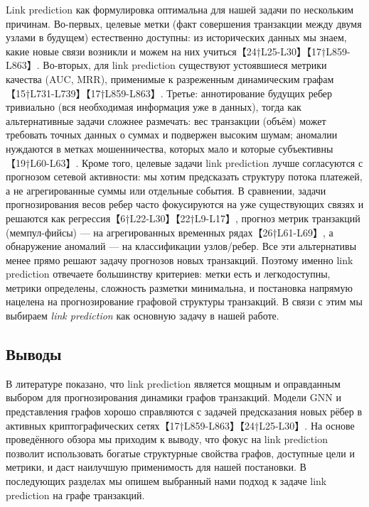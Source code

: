 Link prediction как формулировка оптимальна для нашей задачи по нескольким причинам. Во-первых, целевые метки (факт совершения транзакции между двумя узлами в будущем) естественно доступны: из исторических данных мы знаем, какие новые связи возникли и можем на них учиться【24†L25-L30】【17†L859-L863】. Во-вторых, для link prediction существуют устоявшиеся метрики качества (AUC, MRR), применимые к разреженным динамическим графам【15†L731-L739】【17†L859-L863】. Третье: аннотирование будущих ребер тривиально (вся необходимая информация уже в данных), тогда как альтернативные задачи сложнее размечать: вес транзакции (объём) может требовать точных данных о суммах и подвержен высоким шумам; аномалии нуждаются в метках мошенничества, которых мало и которые субъективны【19†L60-L63】. Кроме того, целевые задачи link prediction лучше согласуются с прогнозом сетевой активности: мы хотим предсказать структуру потока платежей, а не агрегированные суммы или отдельные события. В сравнении, задачи прогнозирования весов ребер часто фокусируются на уже существующих связях и решаются как регрессия【6†L22-L30】【22†L9-L17】, прогноз метрик транзакций (мемпул-фийсы) — на агрегированных временных рядах【26†L61-L69】, а обнаружение аномалий — на классификации узлов/ребер. Все эти альтернативы менее прямо решают задачу прогнозов новых транзакций. Поэтому именно link prediction отвечаете большинству критериев: метки есть и легкодоступны, метрики определены, сложность разметки минимальна, и постановка напрямую нацелена на прогнозирование графовой структуры транзакций. В связи с этим мы выбираем \emph{link prediction} как основную задачу в нашей работе.

\subsection*{Выводы}
В литературе показано, что link prediction является мощным и оправданным выбором для прогнозирования динамики графов транзакций. Модели GNN и представления графов хорошо справляются с задачей предсказания новых рёбер в активных криптографических сетях【17†L859-L863】【24†L25-L30】. На основе проведённого обзора мы приходим к выводу, что фокус на link prediction позволит использовать богатые структурные свойства графов, доступные цели и метрики, и даст наилучшую применимость для нашей постановки. В последующих разделах мы опишем выбранный нами подход к задаче link prediction на графе транзакций.

